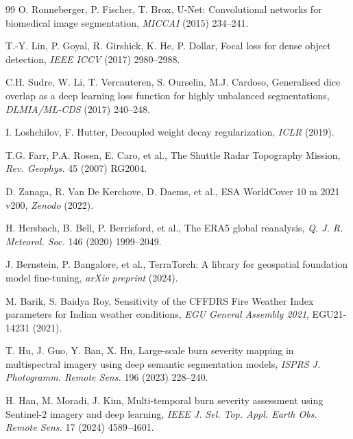 \documentclass[review,12pt]{elsarticle}
\begin{document}
\begin{thebibliography}{99}
O. Ronneberger, P. Fischer, T. Brox,
U-Net: Convolutional networks for biomedical image segmentation,
\textit{MICCAI} (2015) 234--241.

T.-Y. Lin, P. Goyal, R. Girshick, K. He, P. Dollar,
Focal loss for dense object detection,
\textit{IEEE ICCV} (2017) 2980--2988.

C.H. Sudre, W. Li, T. Vercauteren, S. Ourselin, M.J. Cardoso,
Generalised dice overlap as a deep learning loss function for highly unbalanced segmentations,
\textit{DLMIA/ML-CDS} (2017) 240--248.

I. Loshchilov, F. Hutter,
Decoupled weight decay regularization,
\textit{ICLR} (2019).

T.G. Farr, P.A. Rosen, E. Caro, et al.,
The Shuttle Radar Topography Mission,
\textit{Rev. Geophys.} 45 (2007) RG2004.

D. Zanaga, R. Van De Kerchove, D. Daems, et al.,
ESA WorldCover 10 m 2021 v200,
\textit{Zenodo} (2022).

H. Hersbach, B. Bell, P. Berrisford, et al.,
The ERA5 global reanalysis,
\textit{Q. J. R. Meteorol. Soc.} 146 (2020) 1999--2049.

J. Bernstein, P. Bangalore, et al.,
TerraTorch: A library for geospatial foundation model fine-tuning,
\textit{arXiv preprint} (2024).

M. Barik, S. Baidya Roy,
Sensitivity of the CFFDRS Fire Weather Index parameters for Indian weather conditions,
\textit{EGU General Assembly 2021}, EGU21-14231 (2021).

T. Hu, J. Guo, Y. Ban, X. Hu,
Large-scale burn severity mapping in multispectral imagery using deep semantic segmentation models,
\textit{ISPRS J. Photogramm. Remote Sens.} 196 (2023) 228--240.

H. Han, M. Moradi, J. Kim,
Multi-temporal burn severity assessment using Sentinel-2 imagery and deep learning,
\textit{IEEE J. Sel. Top. Appl. Earth Obs. Remote Sens.} 17 (2024) 4589--4601.

\end{thebibliography}
\end{document}
